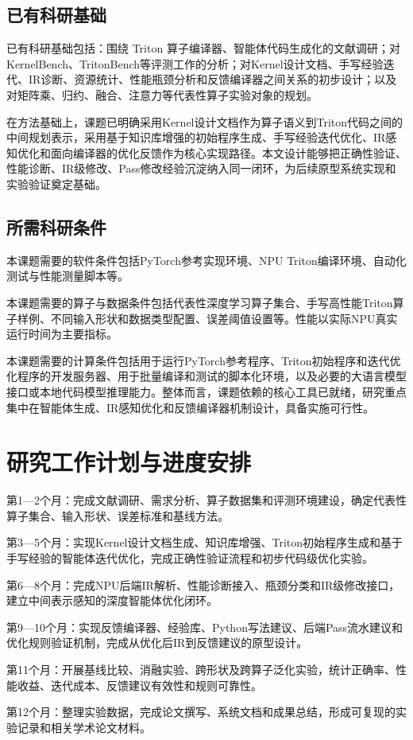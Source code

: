 \section{已有科研基础}

已有科研基础包括：围绕 Triton 算子编译器、智能体代码生成化的文献调研；对KernelBench、TritonBench等评测工作的分析；对Kernel设计文档、手写经验迭代、IR诊断、资源统计、性能瓶颈分析和反馈编译器之间关系的初步设计；以及对矩阵乘、归约、融合、注意力等代表性算子实验对象的规划。

在方法基础上，课题已明确采用Kernel设计文档作为算子语义到Triton代码之间的中间规划表示，采用基于知识库增强的初始程序生成、手写经验迭代优化、IR感知优化和面向编译器的优化反馈作为核心实现路径。本文设计能够把正确性验证、性能诊断、IR级修改、Pass修改经验沉淀纳入同一闭环，为后续原型系统实现和实验验证奠定基础。

\section{所需科研条件}

本课题需要的软件条件包括PyTorch参考实现环境、NPU Triton编译环境、自动化测试与性能测量脚本等。

本课题需要的算子与数据条件包括代表性深度学习算子集合、手写高性能Triton算子样例、不同输入形状和数据类型配置、误差阈值设置等。性能以实际NPU真实运行时间为主要指标。

本课题需要的计算条件包括用于运行PyTorch参考程序、Triton初始程序和迭代优化程序的开发服务器、用于批量编译和测试的脚本化环境，以及必要的大语言模型接口或本地代码模型推理能力。整体而言，课题依赖的核心工具已就绪，研究重点集中在智能体生成、IR感知优化和反馈编译器机制设计，具备实施可行性。

\chapter{研究工作计划与进度安排}

第1—2个月：完成文献调研、需求分析、算子数据集和评测环境建设，确定代表性算子集合、输入形状、误差标准和基线方法。

第3—5个月：实现Kernel设计文档生成、知识库增强、Triton初始程序生成和基于手写经验的智能体迭代优化，完成正确性验证流程和初步代码级优化实验。

第6—8个月：完成NPU后端IR解析、性能诊断接入、瓶颈分类和IR级修改接口，建立中间表示感知的深度智能体优化闭环。

第9—10个月：实现反馈编译器、经验库、Python写法建议、后端Pass流水建议和优化规则验证机制，完成从优化后IR到反馈建议的原型设计。

第11个月：开展基线比较、消融实验、跨形状及跨算子泛化实验，统计正确率、性能收益、迭代成本、反馈建议有效性和规则可靠性。

第12个月：整理实验数据，完成论文撰写、系统文档和成果总结，形成可复现的实验记录和相关学术论文材料。
